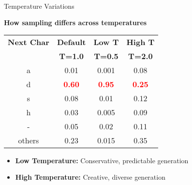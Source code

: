\documentclass[usenames,dvipsnames]{beamer}
\begin{document}
\begin{frame}{Temperature Variations}
\begin{center}
\textbf{How sampling differs across temperatures}
\end{center}

\vspace{0.3cm}
\begin{center}
\begin{tabular}{|c|c|c|c|}
\hline
\textbf{Next Char} & \textbf{Default} & \textbf{Low T} & \textbf{High T} \\
 & \textbf{T=1.0} & \textbf{T=0.5} & \textbf{T=2.0} \\
\hline
a & 0.01 & 0.001 & 0.08 \\
d & \textcolor{red}{\textbf{0.60}} & \textcolor{red}{\textbf{0.95}} & \textcolor{red}{\textbf{0.25}} \\
s & 0.08 & 0.01 & 0.12 \\
h & 0.03 & 0.005 & 0.09 \\
- & 0.05 & 0.02 & 0.11 \\
others & 0.23 & 0.015 & 0.35 \\
\hline
\end{tabular}
\end{center}

\vspace{0.5cm}
\begin{itemize}
\item \textbf{Low Temperature:} Conservative, predictable generation
\item \textbf{High Temperature:} Creative, diverse generation
\end{itemize}
\end{frame}
\end{document}
